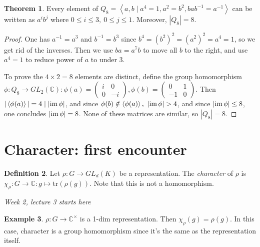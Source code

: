 \documentclass{article}
\newcommand{\tr}{\text{tr}}
\newcommand{\la}{\left\langle}
\newcommand{\ra}{\right\rangle}
\newcommand{\C}{\mathbb{C}}
\newcommand{\im}{\text{im\,}}
\theoremstyle{definition}
\newtheorem{defn}{Definition}[subsection]
\newtheorem{thm}[defn]{Theorem}
\newtheorem{example}[defn]{Example}
\begin{document}
\begin{thm}
Every element of $Q_8=\la a,b \mid a^4=1,a^2=b^2,bab^{-1}=a^{-1}\ra$ can be written as $a^ib^j$ where $0\leq i\leq 3,\ 0\leq j\leq 1$. Moreover, $|Q_8|=8$.
\end{thm}
\begin{proof}
One has $a^{-1}=a^3$ and $b^{-1}=b^3$ since $b^4=(b^2)^2=(a^2)^2=a^4=1$, so we get rid of the inverses. Then we use $ba=a^7b$ to move all $b$ to the right, and use $a^4=1$ to reduce power of $a$ to under 3.

To prove the $4\times 2=8$ elements are distinct, define the group homomorphism $\phi:Q_8\rightarrow GL_2(\C):\phi(a)=\begin{pmatrix}i&0\\0&-i\end{pmatrix},\phi(b)=\begin{pmatrix}0&1\\-1&0\end{pmatrix}$. Then $|\la\phi(a)\ra|=4\mid |\im\phi|$, and since $\phi(b)\notin\la\phi(a)\ra,\ |\im\phi|>4$, and since $|\im\phi|\leq 8$, one concludes $|\im\phi|=8$. None of these matrices are similar, so $|Q_8|=8$.
\end{proof}

\section{Character: first encounter}
\begin{defn}
Let $\rho:G\rightarrow GL_d(K)$ be a representation. The \textit{character} of $\rho$ is $\chi_\rho:G\rightarrow\C:g\mapsto\tr(\rho(g))$. Note that this is not a homomorphism.
\end{defn}

\begin{flushright}
\textit{Week 2, lecture 3 starts here}
\end{flushright}

\begin{example}
$\rho:G\rightarrow \C^\times$ is a 1-dim representation. Then $\chi_\rho(g)=\rho(g)$. In this case, character is a group homomorphism since it's the same as the representation itself.
\end{example}
\end{document}
